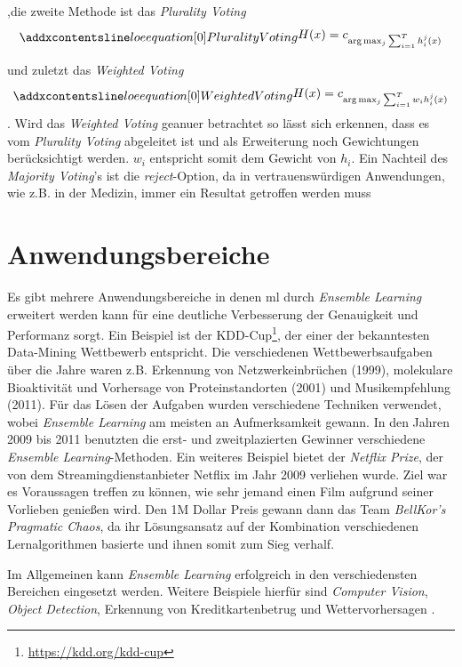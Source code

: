 ,die zweite Methode ist das \textit{Plurality Voting}
\begin{equation}
    \setequationentry{Plurality Voting}{}
    \begin{gathered}
        H(x) = c_{\arg \max_{j}\sum_{i=1}^{T}h_{i}^{j}(x)}
    \end{gathered}
    \label{eq:pluralityVoting}
\end{equation}

und zuletzt das \textit{Weighted Voting}
\begin{equation}
    \setequationentry{Weighted Voting}{}
    \begin{gathered}
        H(x) = c_{\arg \max_{j}\sum_{i=1}^{T}w_{i}h_{i}^{j}(x)}
    \end{gathered}
    \label{eq:weightedVoting}
\end{equation}
. Wird das \textit{Weighted Voting} geanuer betrachtet so lässt sich erkennen, dass es vom \textit{Plurality Voting} abgeleitet ist und als Erweiterung noch Gewichtungen berücksichtigt werden. $w_i$ entspricht somit dem Gewicht von $h_i$. Ein Nachteil des \textit{Majority Voting}'s ist die \textit{reject}-Option, da in vertrauenswürdigen Anwendungen, wie z.B. in der Medizin, immer ein Resultat getroffen werden muss \autocite[vgl. S.195]{Zhou.2021}

\section{Anwendungsbereiche}

Es gibt mehrere Anwendungsbereiche in denen \acrlong{ml} durch \textit{Ensemble Learning} erweitert werden kann für eine deutliche Verbesserung der Genauigkeit und Performanz sorgt. Ein Beispiel ist der KDD-Cup\footnote{\url{https://kdd.org/kdd-cup}}, der einer der bekanntesten Data-Mining Wettbewerb entspricht. Die verschiedenen Wettbewerbsaufgaben über die Jahre waren z.B. Erkennung von Netzwerkeinbrüchen (1999), molekulare Bioaktivität und Vorhersage von Proteinstandorten (2001) und Musikempfehlung (2011). Für das Lösen der Aufgaben wurden verschiedene Techniken verwendet, wobei \textit{Ensemble Learning} am meisten an Aufmerksamkeit gewann. In den Jahren 2009 bis 2011 benutzten die erst- und zweitplazierten Gewinner verschiedene \textit{Ensemble Learning}-Methoden.
Ein weiteres Beispiel bietet der \textit{Netflix Prize}, der von dem Streamingdienstanbieter Netflix im Jahr 2009 verliehen wurde. Ziel war es Voraussagen treffen zu können, wie sehr jemand einen Film aufgrund seiner Vorlieben genießen wird. Den 1M Dollar Preis gewann dann das Team \textit{BellKor's Pragmatic Chaos}, da ihr Lösungsansatz auf der Kombination verschiedenen Lernalgorithmen basierte und ihnen somit zum Sieg verhalf.

Im Allgemeinen kann \textit{Ensemble Learning} erfolgreich in den verschiedensten Bereichen eingesetzt werden. Weitere Beispiele hierfür sind \textit{Computer Vision}, \textit{Object Detection}, Erkennung von Kreditkartenbetrug und Wettervorhersagen \autocite[vgl. S.17f.]{Zhou.2012}.